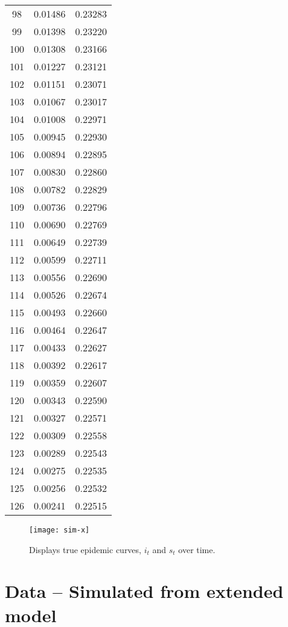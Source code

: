 \documentclass{elsarticle}
\begin{document}
\begin{center}
\begin{longtable}{|c|cc|}
  98 & 0.01486 & 0.23283 \\
  99 & 0.01398 & 0.23220 \\
  100 & 0.01308 & 0.23166 \\
  101 & 0.01227 & 0.23121 \\
  102 & 0.01151 & 0.23071 \\
  103 & 0.01067 & 0.23017 \\
  104 & 0.01008 & 0.22971 \\
  105 & 0.00945 & 0.22930 \\
  106 & 0.00894 & 0.22895 \\
  107 & 0.00830 & 0.22860 \\
  108 & 0.00782 & 0.22829 \\
  109 & 0.00736 & 0.22796 \\
  110 & 0.00690 & 0.22769 \\
  111 & 0.00649 & 0.22739 \\
  112 & 0.00599 & 0.22711 \\
  113 & 0.00556 & 0.22690 \\
  114 & 0.00526 & 0.22674 \\
  115 & 0.00493 & 0.22660 \\
  116 & 0.00464 & 0.22647 \\
  117 & 0.00433 & 0.22627 \\
  118 & 0.00392 & 0.22617 \\
  119 & 0.00359 & 0.22607 \\
  120 & 0.00343 & 0.22590 \\
  121 & 0.00327 & 0.22571 \\
  122 & 0.00309 & 0.22558 \\
  123 & 0.00289 & 0.22543 \\
  124 & 0.00275 & 0.22535 \\
  125 & 0.00256 & 0.22532 \\
  126 & 0.00241 & 0.22515
\label{fig:x}
\end{longtable}
\end{center}

\begin{figure}[ht]
\texttt{[image: sim-x]}
\caption{Displays true epidemic curves, $i_t$ and $s_t$ over time.}
\end{figure}

\clearpage

\section{Data -- Simulated from extended model}
\end{document}
